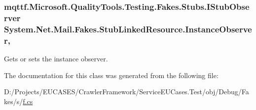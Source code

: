 \hypertarget{class_system_1_1_net_1_1_mail_1_1_fakes_1_1_stub_linked_resource_a9a1ea7386ecfd79f1eab20cd5634114e}{
\subsubsection[{Instance\-Observer}]{\setlength{\rightskip}{0pt plus 5cm}mqttf.\-Microsoft.\-Quality\-Tools.\-Testing.\-Fakes.\-Stubs.\-I\-Stub\-Observer System.\-Net.\-Mail.\-Fakes.\-Stub\-Linked\-Resource.\-Instance\-Observer\hspace{0.3cm}{\ttfamily [get]}, {\ttfamily [set]}}}\label{class_system_1_1_net_1_1_mail_1_1_fakes_1_1_stub_linked_resource_a9a1ea7386ecfd79f1eab20cd5634114e}


Gets or sets the instance observer.



The documentation for this class was generated from the following file\-:\begin{DoxyCompactItemize}
\item 
D\-:/\-Projects/\-E\-U\-C\-A\-S\-E\-S/\-Crawler\-Framework/\-Service\-E\-U\-Cases.\-Test/obj/\-Debug/\-Fakes/s/\hyperlink{s_2f_8cs}{f.\-cs}\end{DoxyCompactItemize}

